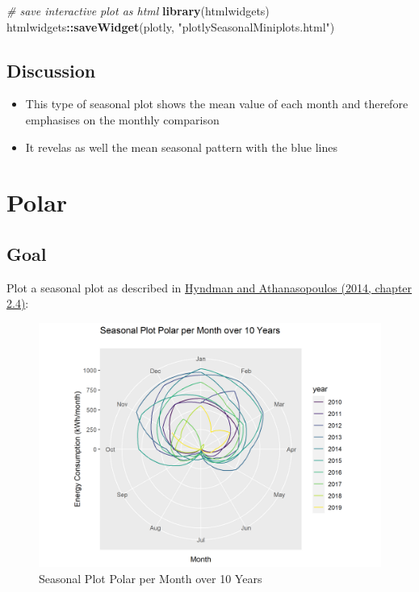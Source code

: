 \documentclass[
  a4paperpaper,
]{book}
\newenvironment{Shaded}{\begin{snugshade}}{\end{snugshade}}
\newcommand{\CommentTok}[1]{\textcolor[rgb]{0.56,0.35,0.01}{\textit{#1}}}
\newcommand{\KeywordTok}[1]{\textcolor[rgb]{0.13,0.29,0.53}{\textbf{#1}}}
\newcommand{\NormalTok}[1]{#1}
\newcommand{\OperatorTok}[1]{\textcolor[rgb]{0.81,0.36,0.00}{\textbf{#1}}}
\newcommand{\StringTok}[1]{\textcolor[rgb]{0.31,0.60,0.02}{#1}}
\let\oldShaded\Shaded
\let\endoldShaded\endShaded
\renewenvironment{Shaded}{\footnotesize\oldShaded}{\endoldShaded}
\begin{document}
\begin{Shaded}
\begin{Highlighting}[]
\CommentTok{# save interactive plot as html}
\KeywordTok{library}\NormalTok{(htmlwidgets)}
\NormalTok{htmlwidgets}\OperatorTok{::}\KeywordTok{saveWidget}\NormalTok{(plotly, }\StringTok{"plotlySeasonalMiniplots.html"}\NormalTok{)}
\end{Highlighting}
\end{Shaded}

\hypertarget{discussion-1}{%
\subsection{Discussion}\label{discussion-1}}

\begin{itemize}
\item
  This type of seasonal plot shows the mean value of each month and therefore emphasises on the monthly comparison
\item
  It revelas as well the mean seasonal pattern with the blue lines
\end{itemize}

\newpage

\hypertarget{polar}{%
\section{Polar}\label{polar}}

\hypertarget{goal-2}{%
\subsection{Goal}\label{goal-2}}

Plot a seasonal plot as described in \href{https://otexts.com/fpp2/seasonal-plots.html}{Hyndman and Athanasopoulos (2014, chapter 2.4)}:

\begin{figure}
\includegraphics[width=0.7\linewidth]{images/plotSeasonalPolar} \caption{Seasonal Plot Polar per Month over 10 Years}\label{fig:unnamed-chunk-11}
\end{figure}
\end{document}
